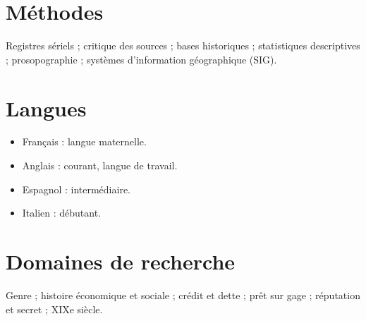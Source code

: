 \documentclass[11pt,a4paper]{article}
\begin{document}
\section{Méthodes}
Registres sériels ; critique des sources ; bases historiques ; statistiques descriptives ; prosopographie ; systèmes d’information géographique (SIG).

\section{Langues}
\begin{itemize}
\item Français : langue maternelle.
\item Anglais : courant, langue de travail.
\item Espagnol : intermédiaire.
\item Italien : débutant.
\end{itemize}

\section{Domaines de recherche}
Genre ; histoire économique et sociale ; crédit et dette ; prêt sur gage ; réputation et secret ; XIXe siècle.
\end{document}
